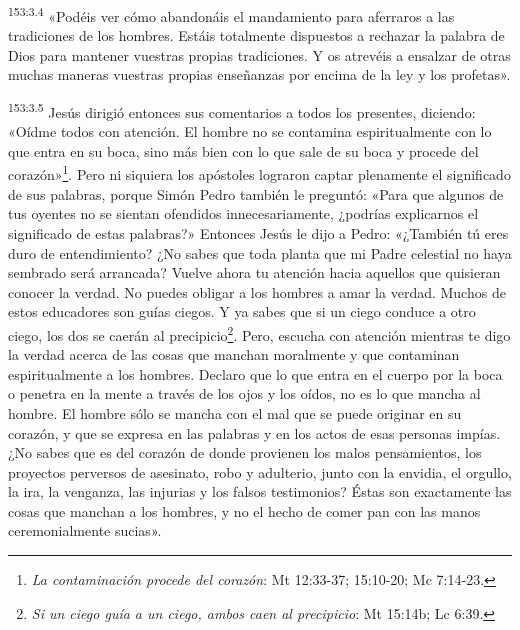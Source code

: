 \par
\textsuperscript{153:3.4} «Podéis ver cómo abandonáis el mandamiento para aferraros a las tradiciones de los hombres. Estáis totalmente dispuestos a rechazar la palabra de Dios para mantener vuestras propias tradiciones. Y os atrevéis a ensalzar de otras muchas maneras vuestras propias enseñanzas por encima de la ley y los profetas».

\par
\textsuperscript{153:3.5} Jesús dirigió entonces sus comentarios a todos los presentes, diciendo: «Oídme todos con atención. El hombre no se contamina espiritualmente con lo que entra en su boca, sino más bien con lo que sale de su boca y procede del corazón»\footnote{\textit{La contaminación procede del corazón}: Mt 12:33-37; 15:10-20; Mc 7:14-23.}. Pero ni siquiera los apóstoles lograron captar plenamente el significado de sus palabras, porque Simón Pedro también le preguntó: «Para que algunos de tus oyentes no se sientan ofendidos innecesariamente, ¿podrías explicarnos el significado de estas palabras?» Entonces Jesús le dijo a Pedro: «¿También tú eres duro de entendimiento? ¿No sabes que toda planta que mi Padre celestial no haya sembrado será arrancada? Vuelve ahora tu atención hacia aquellos que quisieran conocer la verdad. No puedes obligar a los hombres a amar la verdad. Muchos de estos educadores son guías ciegos. Y ya sabes que si un ciego conduce a otro ciego, los dos se caerán al precipicio\footnote{\textit{Si un ciego guía a un ciego, ambos caen al precipicio}: Mt 15:14b; Lc 6:39.}. Pero, escucha con atención mientras te digo la verdad acerca de las cosas que manchan moralmente y que contaminan espiritualmente a los hombres. Declaro que lo que entra en el cuerpo por la boca o penetra en la mente a través de los ojos y los oídos, no es lo que mancha al hombre. El hombre sólo se mancha con el mal que se puede originar en su corazón, y que se expresa en las palabras y en los actos de esas personas impías. ¿No sabes que es del corazón de donde provienen los malos pensamientos, los proyectos perversos de asesinato, robo y adulterio, junto con la envidia, el orgullo, la ira, la venganza, las injurias y los falsos testimonios? Éstas son exactamente las cosas que manchan a los hombres, y no el hecho de comer pan con las manos ceremonialmente sucias».

